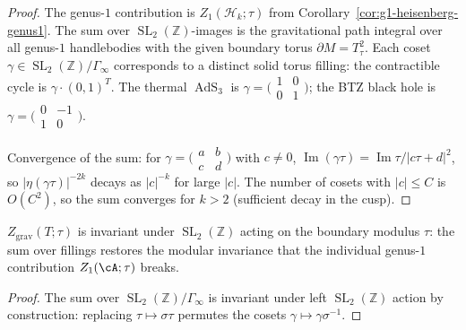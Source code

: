 \begin{proof}
The genus-$1$ contribution is
$Z_1(\mathcal{H}_k;\tau)$ from
Corollary~\ref{cor:g1-heisenberg-genus1}.
The sum over $\operatorname{SL}_2(\mathbb{Z})$-images is the
gravitational path integral over all genus-$1$ handlebodies
with the given boundary torus $\partial M = T^2_\tau$.
Each coset $\gamma \in
\operatorname{SL}_2(\mathbb{Z})/\Gamma_\infty$ corresponds
to a distinct solid torus filling: the contractible cycle is
$\gamma \cdot (0,1)^T$.  The thermal $\operatorname{AdS}_3$
is $\gamma = \bigl(\begin{smallmatrix} 1 & 0 \\
0 & 1 \end{smallmatrix}\bigr)$; the BTZ black hole is
$\gamma = \bigl(\begin{smallmatrix} 0 & -1 \\
1 & 0 \end{smallmatrix}\bigr)$.

Convergence of the sum: for
$\gamma = \bigl(\begin{smallmatrix} a & b \\
c & d \end{smallmatrix}\bigr)$ with $c \neq 0$,
$\operatorname{Im}(\gamma\tau) =
\operatorname{Im}\tau/|c\tau + d|^2$, so
$|\eta(\gamma\tau)|^{-2k}$ decays as $|c|^{-k}$ for large
$|c|$.  The number of cosets with $|c| \leq C$ is $O(C^2)$,
so the sum converges for $k > 2$ (sufficient decay in the
cusp).
\end{proof}

\begin{proposition}%
\label{prop:g1-modular-invariance}%
%
$Z_{\mathrm{grav}}(T;\tau)$ is invariant under
$\operatorname{SL}_2(\mathbb{Z})$ acting on the boundary
modulus $\tau$: the sum over fillings
restores the modular invariance that the individual genus-$1$
contribution $Z_1(\cA;\tau)$ breaks.
\end{proposition}

\begin{proof}
The sum over $\operatorname{SL}_2(\mathbb{Z})/\Gamma_\infty$
is invariant under left $\operatorname{SL}_2(\mathbb{Z})$
action by construction: replacing $\tau \mapsto \sigma\tau$
permutes the cosets $\gamma \mapsto \gamma\sigma^{-1}$.
\end{proof}

